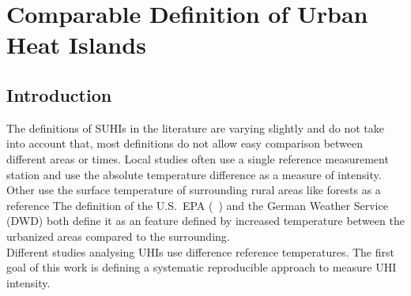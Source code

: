 \documentclass[12pt,a4paper, english]{article}
\begin{document}
    
\newpage
\section{Comparable Definition of Urban Heat Islands}\label{sec:definition}
    \subsection{Introduction}
      The definitions of \glspl{SUHI} in the literature are varying slightly and do not take into account that, most definitions do not allow easy comparison between different areas or times.
      Local studies often use a single reference measurement station and use the absolute temperature difference as a measure of intensity.
      Other use the surface temperature of surrounding rural areas like forests as a reference%
      The definition of the U.S.~EPA (~\cite{EPA2008}) and the German Weather Service (\gls{DWD}) both define it as an feature defined by increased temperature between the urbanized areas compared to the surrounding.\\ 
      Different studies analysing \glspl{UHI} use difference reference temperatures.
      The first goal of this work is defining a systematic reproducible approach to measure \gls{UHI} intensity.
%
\end{document}

